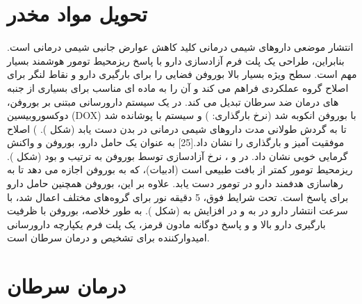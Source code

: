 \section{تحویل مواد مخدر}
انتشار موضعی داروهای شیمی درمانی کلید کاهش عوارض جانبی شیمی درمانی است. بنابراین، طراحی یک پلت فرم آزادسازی دارو با پاسخ ریزمحیط تومور هوشمند بسیار مهم است. سطح ویژه بسیار بالا بوروفن فضایی را برای بارگیری دارو و نقاط لنگر برای اصلاح گروه عملکردی فراهم می کند و آن را به ماده ای مناسب برای بسیاری از جنبه های درمان ضد سرطان تبدیل می کند. در یک سیستم دارورسانی مبتنی بر بوروفن، دوکسوروبیسین (DOX) با بوروفن انکوبه شد (نرخ بارگذاری: ) و سیستم با  پوشانده شد تا به گردش طولانی مدت داروهای شیمی درمانی در بدن دست یابد (شکل ). ) اصلاح موفقیت آمیز  و بارگذاری  را نشان داد.[25] به عنوان یک حامل دارو، بوروفن  و واکنش گرمایی خوبی نشان داد. در  و ، نرخ آزادسازی  توسط بوروفن به ترتیب  و  بود (شکل ).  ریزمحیط تومور کمتر از بافت طبیعی است (ادبیات)، که به بوروفن اجازه می دهد تا به رهاسازی هدفمند دارو در تومور دست یابد. علاوه بر این، بوروفن همچنین حامل دارو برای پاسخ  است. تحت شرایط فوق، 5 دقیقه نور  برای گروه‌های  مختلف اعمال شد، با سرعت انتشار دارو در  به  و در  افزایش به  (شکل ). به طور خلاصه، بوروفن با ظرفیت بارگیری دارو بالا و  و پاسخ دوگانه مادون قرمز، یک پلت فرم یکپارچه دارورسانی امیدوارکننده برای تشخیص و درمان سرطان است.\section{درمان سرطان}
